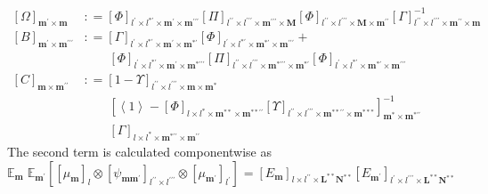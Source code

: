\documentclass[preprint,12pt]{elsarticle}
\newcommand*{\M}[1]{\ensuremath{#1}\xspace}
\newcommand*{\x}{\times}
\newcommand*{\mi}[1]{\mathbf{#1}}
\newcommand*{\te}[2][]{\left\lbrack{#2}\right\rbrack_{#1}}
\newcommand*{\diag}[2][]{\left\langle{#2}\right\rangle_{#1}}
\newcommand*{\deq}{\M{\mathrel{\mathop:}=}}
\newcommand*{\evt}[3][]{\mathbb{E}_{#3}^{#1}\!#2}
\begin{document}
        \begin{equation*}
            \begin{aligned}
                \te[\mi{m^{\prime}\x m}]{\Omega} &\deq 
                \te[l^{\prime}\x l^{*\prime}\x\mi{m^{\prime}}\x\mi{m^{\prime\prime\prime}}]{\Phi}
                \te[l^{\prime\prime}\x l^{\prime\prime\prime}\x\mi{m^{\prime\prime\prime}}\x\mi{M}]{\Pi}
                \te[l^{\prime\prime}\x l^{\prime\prime\prime}\x\mi{M}\x\mi{m^{\prime\prime}}]{\Phi}
                \te[l^{\prime\prime}\x l^{\prime\prime\prime}\x\mi{m^{\prime\prime}}\x\mi{m}]{\Gamma}^{-1} \\
                \te[\mi{m^{\prime}\x m^{\prime\prime\prime}}]{B} &\deq 
                \te[l^{\prime}\x l^{*\prime}\x\mi{m^{\prime}}\x\mi{m^{*\prime}}]{\Gamma}
                \te[l^{\prime}\x l^{*\prime}\x\mi{m^{*\prime}}\x\mi{m^{\prime\prime\prime}}]{\Phi} + \\
                &\phantom{\deq\ }\te[l^{\prime}\x l^{*\prime}\x\mi{m^{\prime}}\x\mi{m^{*\prime\prime\prime}}]{\Phi}
                \te[l^{\prime\prime}\x l^{\prime\prime\prime}\x\mi{m^{*\prime\prime\prime}}\x\mi{m^{*\prime}}]{\Pi}
                \te[l^{\prime}\x l^{*\prime}\x\mi{m^{*\prime}}\x\mi{m^{\prime\prime\prime}}]{\Phi} \\
                \te[\mi{m\x m^{\prime\prime}}]{C} &\deq 
                \te[l^{\prime\prime}\x l^{\prime\prime\prime}\x\mi{m}\x\mi{m^{*}}]{1-\Upsilon} \\
                &\phantom{\deq\ }
                \te[\mi{m^{*}}\x\mi{m^{*\prime\prime}}]{\diag[]{1}
                - \te[l\x l^{*}\x\mi{m^{**}}\x\mi{m^{**\prime\prime}}]{\Phi}\te[l^{\prime\prime}\x l^{\prime\prime\prime}\x\mi{m^{**\prime\prime}}\x\mi{m^{***}}]{\Upsilon}}^{-1} \\
                &\phantom{\deq\ }\te[l\x l^{*}\x\mi{m^{*\prime\prime}}\x\mi{m^{\prime\prime}}]{\Gamma}
            \end{aligned}
        \end{equation*}
        The second term is calculated componentwise as
        \begin{equation*}
            \evt{\;\evt{\te[]{\te[l]{\mu_{\mi{m}}} \otimes \te[l^{\prime\prime}\x l^{\prime\prime\prime}]{\psi_{\mi{mm^{\prime}}}} \otimes \te[l^{\prime}]{\mu_{\mi{m^{\prime}}}}}}{\mi{m^{\prime}}}}{\mi{m}} = 
            \te[l\x l^{\prime\prime}\x \mi{L^{**}N^{**}}]{E_{\mi{m}}}
            \te[l^{\prime}\x l^{\prime\prime\prime}\x \mi{L^{**}N^{**}}]{E_{\mi{m^{\prime}}}}
        \end{equation*}
\end{document}
